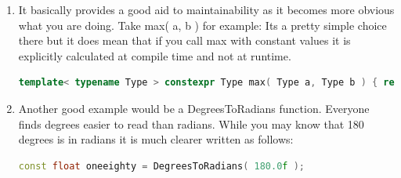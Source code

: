 \documentclass[a4paper,12pt,twoside]{book}
\begin{document}
\begin{itemize}
\begin{enumerate}
    \item It basically provides a good aid to maintainability as it becomes more obvious what you are doing. Take max( a, b ) for example: Its a pretty simple choice there but it does mean that if you call max with constant values it is explicitly calculated at compile time and not at runtime.
    \begin{lstlisting}[frame=single, language=c++]
    template< typename Type > constexpr Type max( Type a, Type b ) { return a < b ? b : a; }
    \end{lstlisting}
    
    
    \item Another good example would be a DegreesToRadians function. Everyone finds degrees easier to read than radians. While you may know that 180 degrees is in radians it is much clearer written as follows:
    \begin{lstlisting}[frame=single, language=c++]
    const float oneeighty = DegreesToRadians( 180.0f );
    \end{lstlisting}
    
\end{enumerate}

\end{itemize}
\end{document}
